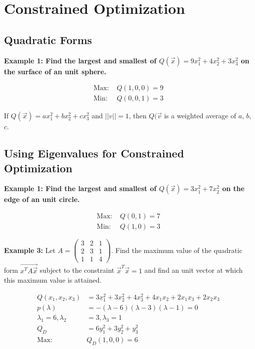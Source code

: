 \section{Constrained Optimization}
\subsection{Quadratic Forms}
\textbf{Example 1: Find the largest and smallest of \(Q(\Vec{x}) = 9 x_1^2 + 4 x_2^2 + 3 x_3^2 \) on the surface of an unit sphere.}

\begin{align}
    \text{Max: }& Q(1, 0, 0) = 9 \\
    \text{Min: }& Q(0, 0, 1) = 3
\end{align}

\noindent
\newline
If \(Q(\Vec{x}) = a x_1^2 + b x_2^2 + c x_3^2\) and \(||v|| = 1\), then \(Q(\Vec{v}\) is a weighted average of \(a\), \(b\), \(c\).

\subsection{Using Eigenvalues for Constrained Optimization}
\noindent
\newline
\textbf{Example 1: Find the largest and smallest of \(Q(\Vec{x}) = 3 x_1^2 + 7 x_2^2 \) on the edge of an unit circle.}

\begin{align}
    \text{Max: }& Q(0, 1) = 7 \\
    \text{Min: }& Q(1, 0) = 3
\end{align}

\noindent
\newline
\textbf{Example 3: } Let \(A = \begin{pmatrix}
    3 & 2 & 1 \\ 2 & 3 & 1 \\ 1 & 1 & 4
\end{pmatrix}\). Find the maximum value of the quadratic form \(\Vec{x^T A \Vec{x}}\) subject to the constraint \(\Vec{x}^T \Vec{x} = 1\) and find an unit vector at which this maximum value is attained.

\begin{align}
    Q(x_1, x_2, x_3) &= 3 x_1^2 + 3 x_2^2 + 4 x_3^2 + 4 x_1 x_2 + 2 x_1 x_3 + 2 x_2 x_3 \\
    p(\lambda) &= -(\lambda-6)(\lambda-3)(\lambda-1) = 0 \\
    \lambda_1 = 6, \lambda_2 &= 3, \lambda_3 = 1 \\
    Q_D &= 6y_1^2 + 3y_2^2 + y_3^2 \\
    \text{Max: }& Q_D(1, 0, 0) = 6
\end{align}

